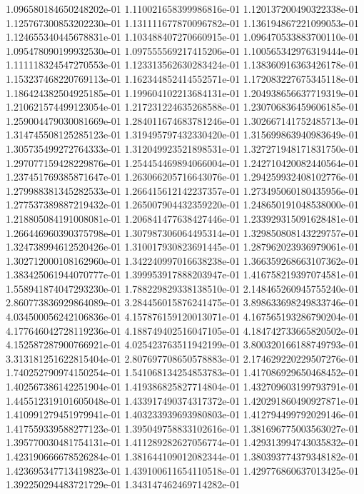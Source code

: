 1.096580184650248202e-01
1.110021658399986816e-01
1.120137200490322338e-01
1.125767300853202230e-01
1.131111677870096782e-01
1.136194867221099053e-01
1.124655340445678831e-01
1.103488407270660915e-01
1.096470533883700110e-01
1.095478090199932530e-01
1.097555569217415206e-01
1.100565342976319444e-01
1.111118324547270553e-01
1.123313562630283424e-01
1.138360916363426178e-01
1.153237468220769113e-01
1.162344852414552571e-01
1.172083227675345118e-01
1.186424382504925185e-01
1.199604102213684131e-01
1.204938656637719319e-01
1.210621574499123054e-01
1.217231224635268588e-01
1.230706836459606185e-01
1.259004479030081669e-01
1.284011674683781246e-01
1.302667141752485713e-01
1.314745508125285123e-01
1.319495797432330420e-01
1.315699863940983649e-01
1.305735499272764333e-01
1.312049923521898531e-01
1.327271948171831750e-01
1.297077159428229876e-01
1.254454469894066004e-01
1.242710420082440564e-01
1.237451769385871647e-01
1.263066205716643076e-01
1.294259932408102776e-01
1.279988381345282533e-01
1.266415612142237357e-01
1.273495060180435956e-01
1.277537389887219432e-01
1.265007904432359220e-01
1.248650191048538000e-01
1.218805084191008081e-01
1.206841477638427446e-01
1.233929315091628481e-01
1.266446960390375798e-01
1.307987306064495314e-01
1.329850808143229757e-01
1.324738994612520426e-01
1.310017930823691445e-01
1.287962023936979061e-01
1.302712000108162960e-01
1.342240997016638238e-01
1.366359268663107362e-01
1.383425061944070777e-01
1.399953917888203947e-01
1.416758219397074581e-01
1.558941874047293230e-01
1.788229829338138510e-01
2.148465260945755240e-01
2.860773836929864089e-01
3.284456015876241475e-01
3.898633698249833746e-01
4.034500056242106836e-01
4.157876159120013071e-01
4.167565193286790204e-01
4.177646042728119236e-01
4.188749402516047105e-01
4.184742733665820502e-01
4.152587287900766921e-01
4.025423763511942199e-01
3.800320166188749793e-01
3.313181251622815404e-01
2.807697708650578883e-01
2.174629220229507276e-01
1.740252790974150254e-01
1.541068134254853783e-01
1.417086929650468452e-01
1.402567386142251904e-01
1.419386825827714804e-01
1.432709603199793791e-01
1.445512319101605048e-01
1.433917490374317372e-01
1.420291860490927871e-01
1.410991279451979941e-01
1.403233939693980803e-01
1.412794499792029146e-01
1.417559339588277123e-01
1.395049758833102616e-01
1.381696775003563027e-01
1.395770030481754131e-01
1.411289282627056774e-01
1.429313994743035832e-01
1.423190666678526284e-01
1.381644109012082344e-01
1.380393774379348182e-01
1.423695347713419823e-01
1.439100611654110518e-01
1.429776860637013425e-01
1.392250294483721729e-01
1.343147462469714282e-01
